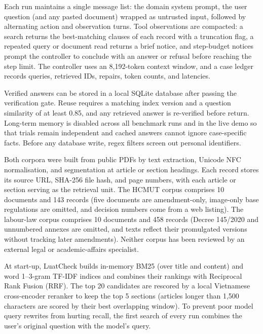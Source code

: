 Each run maintains a single message list: the domain system prompt, the user question (and any pasted document) wrapped as untrusted input, followed by alternating action and observation turns. Tool observations are compacted: a search returns the best-matching clauses of each record with a truncation flag, a repeated query or document read returns a brief notice, and step-budget notices prompt the controller to conclude with an answer or refusal before reaching the step limit. The controller uses an 8,192-token context window, and a case ledger records queries, retrieved IDs, repairs, token counts, and latencies.

 Verified answers can be stored in a local SQLite database after passing the verification gate. Reuse requires a matching index version and a question similarity of at least 0.85, and any retrieved answer is re-verified before return. Long-term memory is disabled across all benchmark runs and in the live demo so that trials remain independent and cached answers cannot ignore case-specific facts. Before any database write, regex filters screen out personal identifiers.

 Both corpora were built from public PDFs by text extraction, Unicode NFC normalisation, and segmentation at article or section headings. Each record stores its source URL, SHA-256 file hash, and page numbers, with each article or section serving as the retrieval unit. The HCMUT corpus comprises 10 documents and 143 records (five documents are amendment-only, image-only base regulations are omitted, and decision numbers come from a web listing). The labour-law corpus comprises 10 documents and 458 records (Decree 145/2020 and unnumbered annexes are omitted, and texts reflect their promulgated versions without tracking later amendments). Neither corpus has been reviewed by an external legal or academic-affairs specialist.

 At start-up, LuatCheck builds in-memory BM25 (over title and content) and word 1--3-gram TF-IDF indices and combines their rankings with Reciprocal Rank Fusion (RRF). The top 20 candidates are rescored by a local Vietnamese cross-encoder reranker to keep the top 5 sections (articles longer than 1{,}500 characters are scored by their best overlapping window). To prevent poor model query rewrites from hurting recall, the first search of every run combines the user's original question with the model's query.

